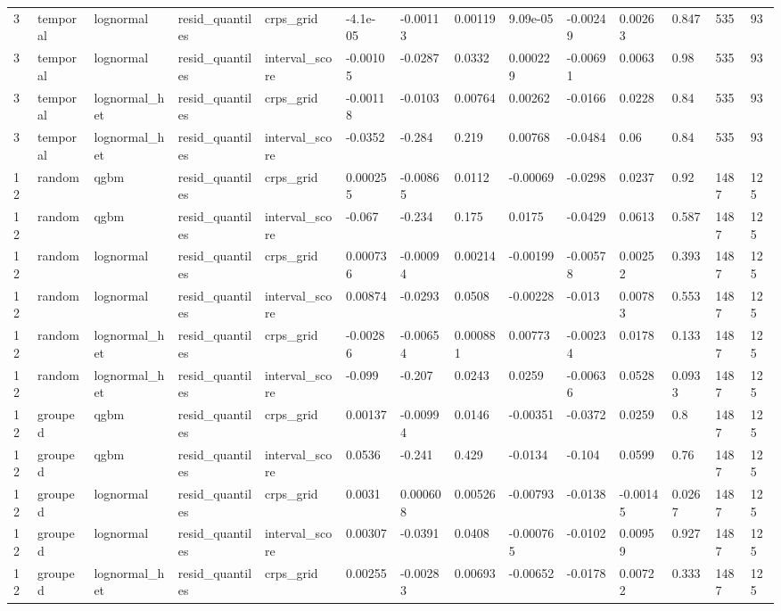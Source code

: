 \begin{tabular}{llllllllllllll}
3 & temporal & lognormal & resid\_quantiles & crps\_grid & -4.1e-05 & -0.00113 & 0.00119 & 9.09e-05 & -0.00249 & 0.00263 & 0.847 & 535 & 93 \\
3 & temporal & lognormal & resid\_quantiles & interval\_score & -0.00105 & -0.0287 & 0.0332 & 0.000229 & -0.00691 & 0.0063 & 0.98 & 535 & 93 \\
3 & temporal & lognormal\_het & resid\_quantiles & crps\_grid & -0.00118 & -0.0103 & 0.00764 & 0.00262 & -0.0166 & 0.0228 & 0.84 & 535 & 93 \\
3 & temporal & lognormal\_het & resid\_quantiles & interval\_score & -0.0352 & -0.284 & 0.219 & 0.00768 & -0.0484 & 0.06 & 0.84 & 535 & 93 \\
12 & random & qgbm & resid\_quantiles & crps\_grid & 0.000255 & -0.00865 & 0.0112 & -0.00069 & -0.0298 & 0.0237 & 0.92 & 1487 & 125 \\
12 & random & qgbm & resid\_quantiles & interval\_score & -0.067 & -0.234 & 0.175 & 0.0175 & -0.0429 & 0.0613 & 0.587 & 1487 & 125 \\
12 & random & lognormal & resid\_quantiles & crps\_grid & 0.000736 & -0.00094 & 0.00214 & -0.00199 & -0.00578 & 0.00252 & 0.393 & 1487 & 125 \\
12 & random & lognormal & resid\_quantiles & interval\_score & 0.00874 & -0.0293 & 0.0508 & -0.00228 & -0.013 & 0.00783 & 0.553 & 1487 & 125 \\
12 & random & lognormal\_het & resid\_quantiles & crps\_grid & -0.00286 & -0.00654 & 0.000881 & 0.00773 & -0.00234 & 0.0178 & 0.133 & 1487 & 125 \\
12 & random & lognormal\_het & resid\_quantiles & interval\_score & -0.099 & -0.207 & 0.0243 & 0.0259 & -0.00636 & 0.0528 & 0.0933 & 1487 & 125 \\
12 & grouped & qgbm & resid\_quantiles & crps\_grid & 0.00137 & -0.00994 & 0.0146 & -0.00351 & -0.0372 & 0.0259 & 0.8 & 1487 & 125 \\
12 & grouped & qgbm & resid\_quantiles & interval\_score & 0.0536 & -0.241 & 0.429 & -0.0134 & -0.104 & 0.0599 & 0.76 & 1487 & 125 \\
12 & grouped & lognormal & resid\_quantiles & crps\_grid & 0.0031 & 0.000608 & 0.00526 & -0.00793 & -0.0138 & -0.00145 & 0.0267 & 1487 & 125 \\
12 & grouped & lognormal & resid\_quantiles & interval\_score & 0.00307 & -0.0391 & 0.0408 & -0.000765 & -0.0102 & 0.00959 & 0.927 & 1487 & 125 \\
12 & grouped & lognormal\_het & resid\_quantiles & crps\_grid & 0.00255 & -0.00283 & 0.00693 & -0.00652 & -0.0178 & 0.00722 & 0.333 & 1487 & 125 \\

\end{tabular}
